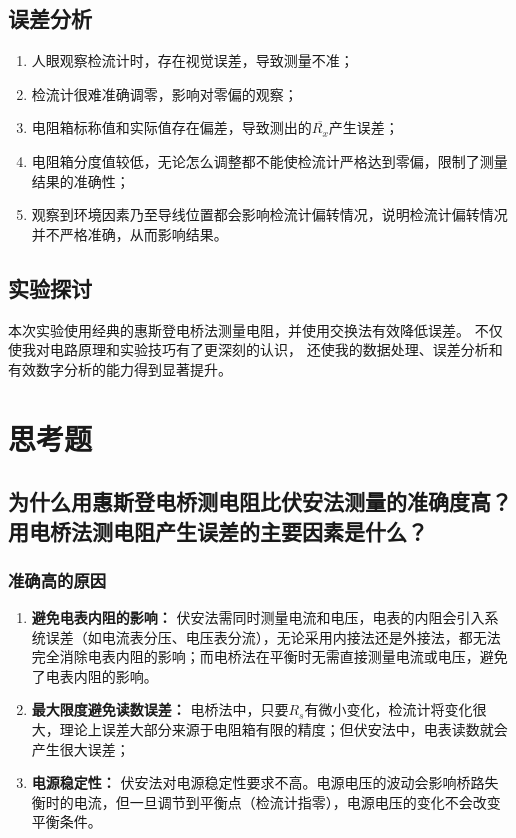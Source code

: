 \documentclass[]{../template/Report}%
\begin{document}
\begin{fullreportonly}
\subsection{误差分析}
\begin{enumerate}
    \item 人眼观察检流计时，存在视觉误差，导致测量不准；
    \item 检流计很难准确调零，影响对零偏的观察；
    \item 电阻箱标称值和实际值存在偏差，导致测出的$\overline{R_x}$产生误差；
    \item 电阻箱分度值较低，无论怎么调整都不能使检流计严格达到零偏，限制了测量结果的准确性；
    \item 观察到环境因素乃至导线位置都会影响检流计偏转情况，说明检流计偏转情况并不严格准确，从而影响结果。
\end{enumerate}
\subsection{实验探讨}
本次实验使用经典的惠斯登电桥法测量电阻，并使用交换法有效降低误差。
不仅使我对电路原理和实验技巧有了更深刻的认识，
还使我的数据处理、误差分析和有效数字分析的能力得到显著提升。
\section{思考题}
\subsection{为什么用惠斯登电桥测电阻比伏安法测量的准确度高？用电桥法测电阻产生误差的主要因素是什么？}

\subsubsection{准确高的原因}
\begin{enumerate}
    \item \textbf{避免电表内阻的影响：} 伏安法需同时测量电流和电压，电表的内阻会引入系统误差（如电流表分压、电压表分流），无论采用内接法还是外接法，都无法完全消除电表内阻的影响；而电桥法在平衡时无需直接测量电流或电压，避免了电表内阻的影响。
    
    \item \textbf{最大限度避免读数误差：} 电桥法中，只要$R_s$有微小变化，检流计将变化很大，理论上误差大部分来源于电阻箱有限的精度；但伏安法中，电表读数就会产生很大误差；

    \item \textbf{电源稳定性：} 伏安法对电源稳定性要求不高。电源电压的波动会影响桥路失衡时的电流，但一旦调节到平衡点（检流计指零），电源电压的变化不会改变平衡条件。
\end{enumerate}

\end{fullreportonly}
\end{document}
